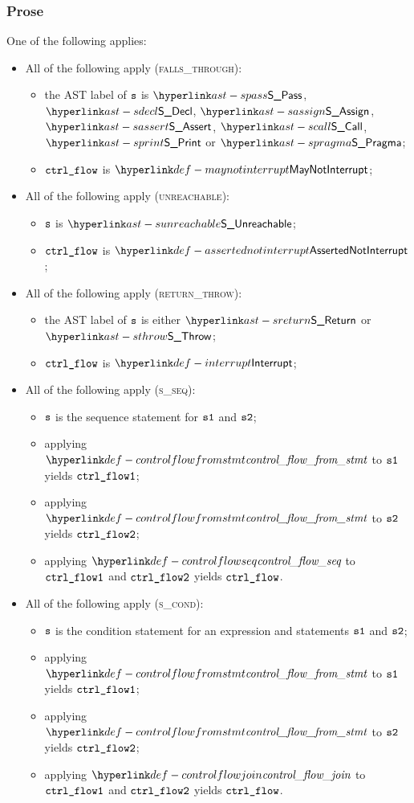 \subsubsection{Prose}
One of the following applies:
\begin{itemize}
  \item All of the following apply (\textsc{falls\_through}):
  \begin{itemize}
    \item the AST label of $\texttt{s}$ is $\SPass$, $\SDecl$, $\SAssign$, $\SAssert$, $\SCall$, $\SPrint$ or $\SPragma$;
    \item $\texttt{ctrl\_flow}$ is $\maynotinterrupt$;
  \end{itemize}

  \item All of the following apply (\textsc{unreachable}):
  \begin{itemize}
    \item $\texttt{s}$ is $\SUnreachable$;
    \item $\texttt{ctrl\_flow}$ is $\assertednotinterrupt$;
  \end{itemize}

  \item All of the following apply (\textsc{return\_throw}):
  \begin{itemize}
    \item the AST label of $\texttt{s}$ is either $\SReturn$ or $\SThrow$;
    \item $\texttt{ctrl\_flow}$ is $\interrupt$;
  \end{itemize}

  \item All of the following apply (\textsc{s\_seq}):
  \begin{itemize}
    \item $\texttt{s}$ is the sequence statement for $\texttt{s1}$ and $\texttt{s2}$;
    \item applying $\controlflowfromstmt$ to $\texttt{s1}$ yields $\texttt{ctrl\_flow1}$;
    \item applying $\controlflowfromstmt$ to $\texttt{s2}$ yields $\texttt{ctrl\_flow2}$;
    \item applying $\controlflowseq$ to $\texttt{ctrl\_flow1}$ and $\texttt{ctrl\_flow2}$ yields $\texttt{ctrl\_flow}$.
  \end{itemize}

  \item All of the following apply (\textsc{s\_cond}):
  \begin{itemize}
    \item $\texttt{s}$ is the condition statement for an expression and statements $\texttt{s1}$ and $\texttt{s2}$;
    \item applying $\controlflowfromstmt$ to $\texttt{s1}$ yields $\texttt{ctrl\_flow1}$;
    \item applying $\controlflowfromstmt$ to $\texttt{s2}$ yields $\texttt{ctrl\_flow2}$;
    \item applying $\controlflowjoin$ to $\texttt{ctrl\_flow1}$ and $\texttt{ctrl\_flow2}$ yields $\texttt{ctrl\_flow}$.
  \end{itemize}


\end{itemize}
